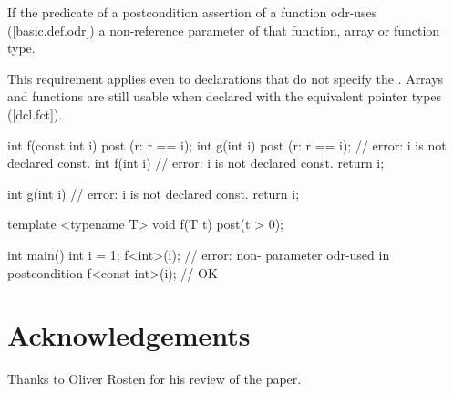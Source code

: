 \begin{adjustwidth}{0.5cm}{0.5cm}
If the predicate of a postcondition assertion of a function odr-uses ([basic.def.odr]) a
non-reference parameter of that function, array or function type. 
\begin{note}
This requirement applies even to declarations that do not specify the . Arrays and functions are still usable when
declared with the equivalent pointer types ([dcl.fct]). 
\end{note}
\begin{example}
\begin{codeblock}
int f(const int i)
post (r: r == i);
int g(int i)
post (r: r == i); // error: i is not declared const.
int f(int i) // error: i is not declared const.
{
  return i;
}

int g(int i) // error: i is not declared const.
{
  return i;
}
\end{codeblock}
\begin{addedblock}
\begin{codeblock}
template <typename T>
void f(T t) post(t > 0);
  
int main() {
  int i = 1;
  f<int>(i);        // error: non- parameter odr-used in postcondition 
  f<const int>(i);  // OK
}
\end{codeblock}
\end{addedblock}
\end{example}
\end{adjustwidth}


\section*{Acknowledgements}

Thanks to Oliver Rosten for his review of the paper.


\renewcommand{\addcontentsline}[3]{}%







